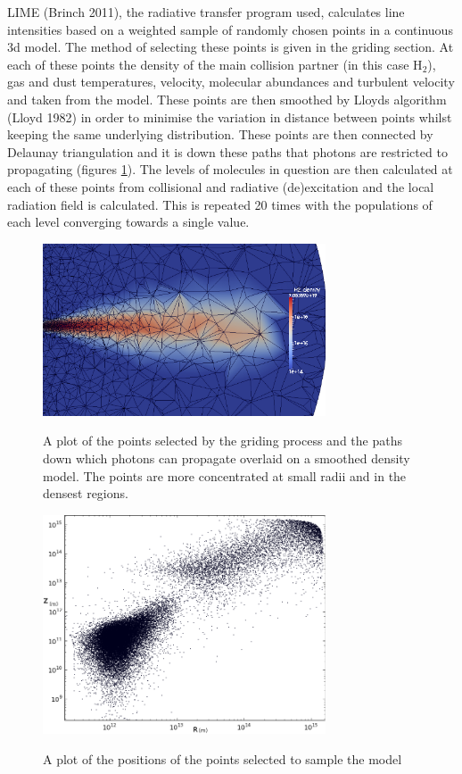 \documentclass[useAMS,usenatbib]{mn2e}
\begin{document}
LIME (Brinch 2011), the radiative transfer program used, calculates line intensities based on a weighted sample of randomly chosen points in a continuous 3d model. The method of selecting these points is given in the griding section. At each of these points the density of the main collision partner (in this case H$_2$), gas and dust temperatures, velocity, molecular abundances and turbulent velocity and taken from the model. These points are then smoothed by Lloyds algorithm (Lloyd 1982) in order to minimise the variation in distance between points whilst keeping the same underlying distribution. These points are then connected by Delaunay triangulation and it is down these paths that photons are restricted to propagating (figures \ref{grid}). The levels of molecules in question are then  calculated at each of these points from collisional and radiative (de)excitation and the local radiation field is calculated. This is repeated 20 times with the populations of each level converging towards a single value.\newline


\begin{figure}
 \includegraphics[width=84mm]{Figures/model/Lime_grid3.png}
 \label{grid}
 \caption{A plot of the points selected by the griding process and the paths down which photons can propagate overlaid on a smoothed density model. The points are more concentrated at small radii and in the densest regions.}
\end{figure}

\begin{figure}
 \includegraphics[width=84mm]{Figures/model/lime_points_rz2.png}
 \label{points}
 \caption{A plot of the positions of the points selected to sample the model}
\end{figure}
\end{document}
